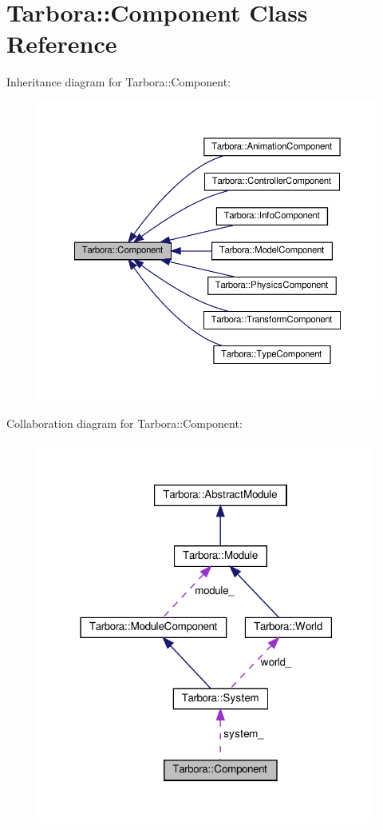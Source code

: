 \hypertarget{classTarbora_1_1Component}{}\section{Tarbora\+:\+:Component Class Reference}
\label{classTarbora_1_1Component}


Inheritance diagram for Tarbora\+:\+:Component\+:\nopagebreak
\begin{figure}[H]
\begin{center}
\leavevmode
\includegraphics[width=350pt]{classTarbora_1_1Component__inherit__graph}
\end{center}
\end{figure}


Collaboration diagram for Tarbora\+:\+:Component\+:\nopagebreak
\begin{figure}[H]
\begin{center}
\leavevmode
\includegraphics[width=316pt]{classTarbora_1_1Component__coll__graph}
\end{center}
\end{figure}
